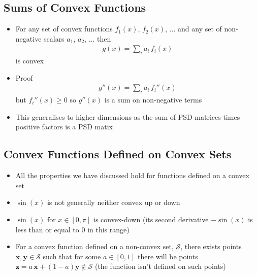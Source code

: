 
\begin{slide}
\section[-2]{Sums of Convex Functions}

\begin{PauseHighLight}
  \begin{itemize}
  \item For any set of convex functions $f_1(x)$, $f_2(x)$, $\ldots$
    and any set of non-negative scalars $a_1$, $a_2$, $\ldots$ then
    \begin{align*}
      g(x) = \sum_i a_i\,f_i(x)
    \end{align*}
    is convex\pause
  \item Proof
    \begin{align*}
      g''(x) = \sum_i a_i \, f_i''(x)
    \end{align*}
    but $f_i''(x)\geq 0$ so $g''(x)$ is a sum on non-negative
    terms\pause
  \item This generalises to higher dimensions as the sum of PSD
    matrices times positive factors is a PSD matix\pause
  \end{itemize}
\end{PauseHighLight}
  

\end{slide}



\begin{slide}
\section[-2]{Convex Functions Defined on Convex Sets}

\pb
\begin{itemize}
\item All the properties we have discussed hold for functions
  defined on a convex set\pauseh
\item $\sin(x)$ is not generally neither convex up or down\pauseh
\item $\sin(x)$ for $x\in[0, \pi]$ is convex-down\pauseh{} (its second
  derivative $-\sin(x)$ is less than or equal to 0 in this
  range)\pause
  \begin{center}
    \pause
  \end{center}
\item For a convex function defined on a non-convex set,
  $\mathcal{S}$, there exists points $\bm{x},\bm{y} \in \mathcal{S}$
  such that for some $a\in[0,1]$ there will be points
  $\bm{z}=a\,\bm{x}+(1-a)\bm{y}\not\in\mathcal{S}$\pauseh{} (the
  function isn't defined on such points)\pause
\end{itemize}
  

\end{slide}

